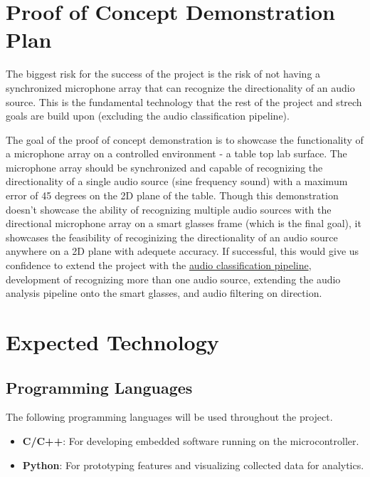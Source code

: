 \documentclass{article}
\begin{document}
\section{Proof of Concept Demonstration Plan}


\hspace{1cm}

The biggest risk for the success of the project is the risk of not having a synchronized microphone array that can recognize the directionality of an audio source.
This is the fundamental technology that the rest of the project and strech goals are build upon (excluding the audio classification pipeline).

The goal of the proof of concept demonstration is to showcase the functionality of a microphone array on a controlled environment - a table top lab surface.
The microphone array should be synchronized and capable of recognizing the directionality of a single audio source (sine frequency sound) with a maximum error of 45 degrees on the 2D plane of the table.
Though this demonstration doesn't showcase the ability of recognizing multiple audio sources with the directional microphone array on a smart glasses frame (which is the final goal), it showcases the feasibility of recoginizing the directionality of an audio source anywhere on a 2D plane with adequete accuracy.
If successful, this would give us confidence to extend the project with the \hyperlink{audio_classification_pipeline}{audio classification pipeline}, development of recognizing more than one audio source, extending the audio analysis pipeline onto the smart glasses, and audio filtering on direction. 

\section{Expected Technology}

\subsection{Programming Languages}
The following programming languages will be used throughout the project.
\begin{itemize}
  \item \textbf{C/C++}: For developing embedded software running on the microcontroller.
  \item \textbf{Python}: For prototyping features and visualizing collected data for analytics.
\end{itemize}
\end{document}
